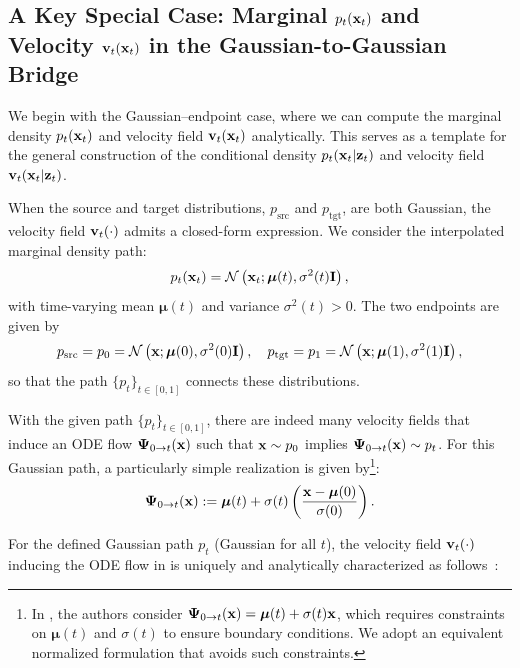 \subsection{A Key Special Case: Marginal $p_t({\mathbf{x}}_t)$ and Velocity ${\mathbf{v}}_t({\mathbf{x}}_t)$ in the Gaussian-to-Gaussian Bridge}\label{subsec:special-fm-instantiations}

We begin with the Gaussian–endpoint case, where we can compute the marginal density $p_t({\mathbf{x}}_t)$ and velocity field ${\mathbf{v}}_t({\mathbf{x}}_t)$ analytically. This serves as a template for the general construction of the conditional density $p_t({\mathbf{x}}_t |{\mathbf{z}}_t)$ and velocity field ${\mathbf{v}}_t({\mathbf{x}}_t |{\mathbf{z}}_t)$.


 
When the source and target distributions, $p_{\text{src}}$ and $p_{\text{tgt}}$, are both Gaussian, the velocity field ${\mathbf{v}}_t(\cdot)$ admits a closed-form expression. We consider the interpolated marginal density path:
\begin{align}\label{eq:gaussian-density-path}
    p_t({\mathbf{x}}_t) = \mathcal{N}\left({\mathbf{x}}_t; \bm{\mu}(t), \sigma^2(t) {\mathbf{I}}\right),
\end{align}
with time-varying mean $\bm{\mu}(t)$ and variance $\sigma^2(t)>0$. The two endpoints are given by
\[
p_{\text{src}} = p_0 =  \mathcal{N}\left({\mathbf{x}}; \bm{\mu}(0), \sigma^2(0) {\mathbf{I}}\right), \quad
p_{\text{tgt}} = p_1 =  \mathcal{N}\left({\mathbf{x}}; \bm{\mu}(1), \sigma^2(1) {\mathbf{I}}\right),
\]
so that the path $\{p_t\}_{t \in [0,1]}$ connects these distributions.

With the given path $\{p_t\}_{t \in [0,1]}$, there are indeed many velocity fields that induce an ODE flow $\bm{\Psi}_{0\to t}({\mathbf{x}})$ such that ${\mathbf{x}} \sim p_0$ implies $\bm{\Psi}_{0\to t}({\mathbf{x}}) \sim p_t$. For this Gaussian path, a particularly simple realization is given by\footnote{In \citep{lipman2022flow}, the authors consider $\bm{\Psi}_{0\to t}({\mathbf{x}}) = \bm{\mu}(t) + \sigma(t){\mathbf{x}}$, which requires constraints on $\bm{\mu}(t)$ and $\sigma(t)$ to ensure boundary conditions. We adopt an equivalent normalized formulation that avoids such constraints.}:
\begin{align}\label{eq:gaussian-sol-map}
    \bm{\Psi}_{0\to t}({\mathbf{x}}) := \bm{\mu}(t) + \sigma(t) \left( \frac{{\mathbf{x}} - \bm{\mu}(0)}{\sigma(0)} \right).
\end{align}

For the defined Gaussian path $p_t$ (Gaussian for all $t$), the velocity field ${\mathbf{v}}_t(\cdot)$ inducing the ODE flow in  is uniquely and analytically characterized as follows~\citep{lipman2022flow}:

